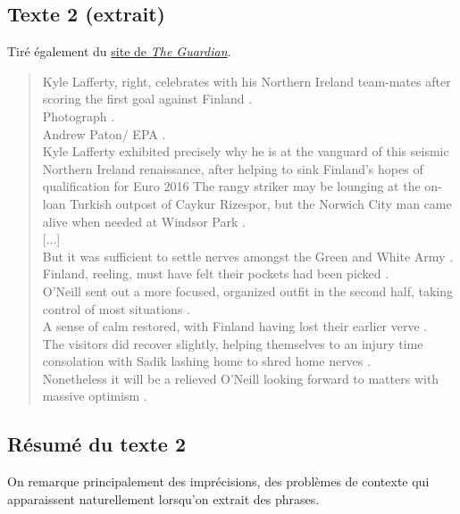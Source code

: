 \documentclass[a4paper, 12pt]{article}
\begin{document}
\subsection{Texte 2 (extrait)}

Tiré également du \href{http://www.theguardian.com/football/2015/mar/29/northern-ireland-finland-euro-2016-qualifier-match-report}{site de \textit{The Guardian}}.

\begin{quotation}
 Kyle Lafferty,  right,  celebrates with his Northern Ireland team-mates after scoring the first goal against Finland . \\
Photograph . \\
Andrew Paton/ EPA . \\
Kyle Lafferty exhibited precisely why he is at the vanguard of this seismic Northern Ireland renaissance,  after helping to sink Finland’s hopes of qualification for Euro 2016
The rangy striker may be lounging at the on-loan Turkish outpost of Caykur Rizespor,  but the Norwich City man came alive when needed at Windsor Park . \\

[...]\\

But it was sufficient to settle nerves amongst the Green and White Army . \\
Finland,  reeling,  must have felt their pockets had been picked . \\
O’Neill sent out a more focused,  organized outfit in the second half,  taking control of most situations . \\
A sense of calm restored,  with Finland having lost their earlier verve . \\
The visitors did recover slightly,  helping themselves to an injury time consolation with Sadik lashing home to shred home nerves . \\
Nonetheless it will be a relieved O’Neill looking forward to matters with massive optimism . \\
\end{quotation}

\subsection{Résumé du texte 2}

On remarque principalement des imprécisions, des problèmes de contexte qui apparaissent naturellement lorsqu'on extrait des phrases.
\end{document}
